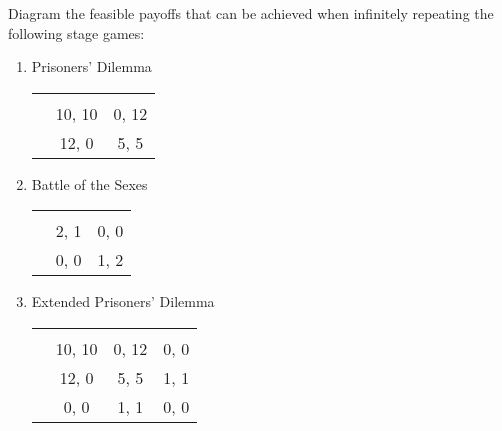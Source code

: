 \documentclass[10pt]{article}
\begin{document}
\begin{spacing}{1.0}
\newpage
\begin{exercise}
  Diagram the feasible payoffs that can be achieved when infinitely repeating the
  following stage games:
  \begin{enumerate}
  \item Prisoners' Dilemma
    \begin{center}
      \begin{tabular}{rcc}
        &  &    \\ \cline{2-3}
        \multicolumn{1}{l|}{} & 10, 10 & 0, 12  \\
        \multicolumn{1}{l|}{} & 12, 0  & 5, 5   \\
      \end{tabular}
    \end{center}
  \item Battle of the Sexes
    \begin{center}
      \begin{tabular}{rcc}
        &  &    \\ \cline{2-3}
        \multicolumn{1}{l|}{} & 2, 1 & 0, 0  \\
        \multicolumn{1}{l|}{} & 0, 0 & 1, 2  \\
      \end{tabular}
    \end{center}
  \item Extended Prisoners' Dilemma
    \begin{center}
    \begin{tabular}{rccc}
      &  &  &  \\ \cline{2-4}
      \multicolumn{1}{l|}{} & 10, 10 & 0, 12  & 0, 0 \\
      \multicolumn{1}{l|}{} & 12, 0  & 5, 5   & 1, 1  \\
      \multicolumn{1}{l|}{} & 0, 0   & 1, 1   & 0, 0  \\
    \end{tabular}
  \end{center}
  \end{enumerate}
\end{exercise}

\end{spacing}
\end{document}
